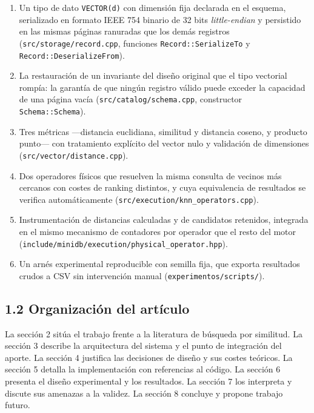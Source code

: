 \documentclass[11pt,a4paper]{article}
\providecommand{\tightlist}{%
  \setlength{\itemsep}{0pt}\setlength{\parskip}{0pt}}
\let\pandocsubsection\subsection
\let\subsection\section
\let\subsubsection\pandocsubsection
\begin{document}
\begin{enumerate}
\def\labelenumi{\arabic{enumi}.}
\tightlist
\item
  Un tipo de dato \texttt{VECTOR(d)} con dimensión fija declarada en el
  esquema, serializado en formato IEEE 754 binario de 32 bits
  \emph{little-endian} y persistido en las mismas páginas ranuradas que
  los demás registros (\texttt{src/storage/record.cpp}, funciones
  \texttt{Record::SerializeTo} y \texttt{Record::DeserializeFrom}).
\item
  La restauración de un invariante del diseño original que el tipo
  vectorial rompía: la garantía de que ningún registro válido puede
  exceder la capacidad de una página vacía
  (\texttt{src/catalog/schema.cpp}, constructor
  \texttt{Schema::Schema}).
\item
  Tres métricas ---distancia euclidiana, similitud y distancia coseno, y
  producto punto--- con tratamiento explícito del vector nulo y
  validación de dimensiones (\texttt{src/vector/distance.cpp}).
\item
  Dos operadores físicos que resuelven la misma consulta de vecinos más
  cercanos con costes de ranking distintos, y cuya equivalencia de
  resultados se verifica automáticamente
  (\texttt{src/execution/knn\_operators.cpp}).
\item
  Instrumentación de distancias calculadas y de candidatos retenidos,
  integrada en el mismo mecanismo de contadores por operador que el
  resto del motor
  (\texttt{include/minidb/execution/physical\_operator.hpp}).
\item
  Un arnés experimental reproducible con semilla fija, que exporta
  resultados crudos a CSV sin intervención manual
  (\texttt{experimentos/scripts/}).
\end{enumerate}

\subsubsection{1.2 Organización del
artículo}\label{12-organizaciuxf3n-del-artuxedculo}

La sección 2 sitúa el trabajo frente a la literatura de búsqueda por
similitud. La sección 3 describe la arquitectura del sistema y el punto
de integración del aporte. La sección 4 justifica las decisiones de
diseño y sus costes teóricos. La sección 5 detalla la implementación con
referencias al código. La sección 6 presenta el diseño experimental y
los resultados. La sección 7 los interpreta y discute sus amenazas a la
validez. La sección 8 concluye y propone trabajo futuro.
\end{document}
